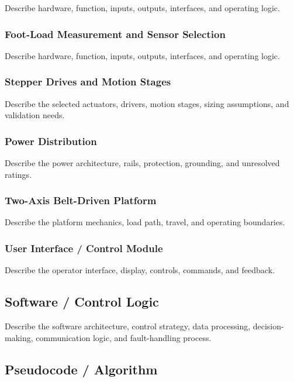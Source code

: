 Describe hardware, function, inputs, outputs, interfaces, and operating logic.

\subsubsection{Foot-Load Measurement and Sensor Selection}

Describe hardware, function, inputs, outputs, interfaces, and operating logic.

\subsubsection{Stepper Drives and Motion Stages}

Describe the selected actuators, drivers, motion stages, sizing assumptions, and validation needs.

\subsubsection{Power Distribution}

Describe the power architecture, rails, protection, grounding, and unresolved ratings.

\subsubsection{Two-Axis Belt-Driven Platform}

Describe the platform mechanics, load path, travel, and operating boundaries.

\subsubsection{User Interface / Control Module}

Describe the operator interface, display, controls, commands, and feedback.

\subsection{Software / Control Logic}

Describe the software architecture, control strategy, data processing,
decision-making, communication logic, and fault-handling process.

\subsection{Pseudocode / Algorithm}

